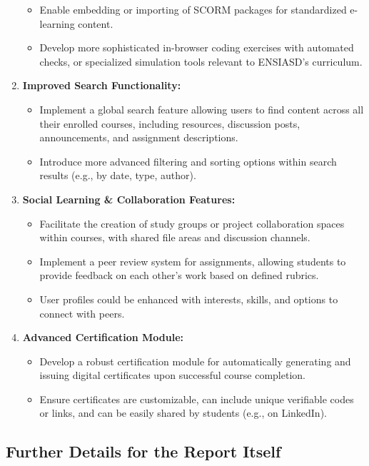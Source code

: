 \documentclass[12pt,a4paper]{article}
\begin{document}
\begin{enumerate}
\begin{itemize}
        \item Enable embedding or importing of SCORM packages for standardized e-learning content.
        \item Develop more sophisticated in-browser coding exercises with automated checks, or specialized simulation tools relevant to ENSIASD's curriculum.
    \end{itemize}
    \item \textbf{Improved Search Functionality:}
    \begin{itemize}
        \item Implement a global search feature allowing users to find content across all their enrolled courses, including resources, discussion posts, announcements, and assignment descriptions.
        \item Introduce more advanced filtering and sorting options within search results (e.g., by date, type, author).
    \end{itemize}
    \item \textbf{Social Learning \& Collaboration Features:}
    \begin{itemize}
        \item Facilitate the creation of study groups or project collaboration spaces within courses, with shared file areas and discussion channels.
        \item Implement a peer review system for assignments, allowing students to provide feedback on each other's work based on defined rubrics.
        \item User profiles could be enhanced with interests, skills, and options to connect with peers.
    \end{itemize}
    \item \textbf{Advanced Certification Module:}
    \begin{itemize}
        \item Develop a robust certification module for automatically generating and issuing digital certificates upon successful course completion.
        \item Ensure certificates are customizable, can include unique verifiable codes or links, and can be easily shared by students (e.g., on LinkedIn).
    \end{itemize}
\end{enumerate}

\subsection{Further Details for the Report Itself}
\end{document}

